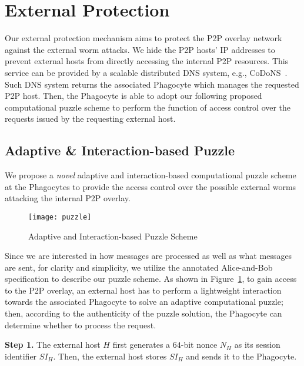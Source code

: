 \documentclass[times,10pt,twocolumn]{article}
\begin{document}
\section{External Protection}
\label{sec:ExternalDefenses}


Our external protection mechanism aims to protect the P2P overlay
network against the external worm attacks. We hide the P2P hosts' IP
addresses to prevent external hosts from directly accessing the
internal P2P resources. This service can be provided by a scalable
distributed DNS system, e.g., CoDoNS~\cite{1015504}. Such DNS system
returns the associated Phagocyte which manages the requested P2P
host. Then, the Phagocyte is able to adopt our following proposed
computational puzzle scheme to perform the function of access
control over the requests issued by the requesting external host.



\subsection{Adaptive \& Interaction-based Puzzle}


We propose a \emph{novel} adaptive and interaction-based
computational puzzle scheme at the Phagocytes to provide the access
control over the possible external worms attacking the internal P2P
overlay.


\begin{figure}[tbp]
\centering
\texttt{[image: puzzle]}
\caption{Adaptive and Interaction-based Puzzle Scheme}
\label{fig:puzzle}
\end{figure}



Since we are interested in how messages are processed as well as
what messages are sent, for clarity and simplicity, we utilize the
annotated Alice-and-Bob specification to describe our puzzle scheme.
As shown in Figure~\ref{fig:puzzle}, to gain access to the P2P
overlay, an external host has to perform a lightweight interaction
towards the associated Phagocyte to solve an adaptive computational
puzzle; then, according to the authenticity of the puzzle solution,
the Phagocyte can determine whether to process the request.




\textbf{Step 1.} The external host $H$ first generates a $64$-bit
nonce $N_H$ as its session identifier $SI_H$. Then, the external
host stores $SI_H$ and sends it to the Phagocyte.
\end{document}
